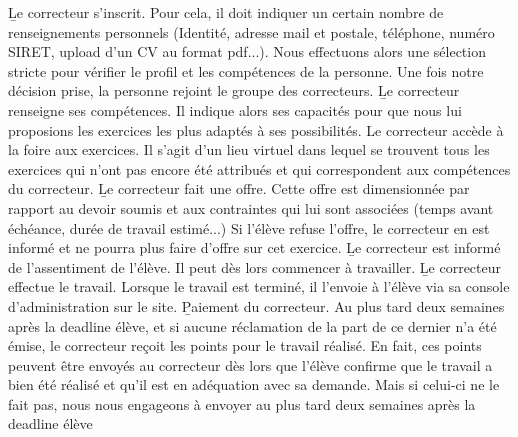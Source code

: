 ﻿\begin{enumerate}
	\li \b{Le correcteur s’inscrit.} Pour cela, il doit indiquer un certain nombre de renseignements personnels  (Identité, adresse mail et postale, téléphone, numéro SIRET, upload d’un CV au format pdf...). Nous effectuons alors une sélection stricte pour vérifier le profil et les compétences de la personne. Une fois notre décision prise, la personne rejoint le groupe des correcteurs.
	\li\b{Le correcteur renseigne ses compétences.} Il indique alors ses capacités pour que nous lui proposions les exercices les plus adaptés à ses possibilités.
	\li \b{ Le correcteur accède à la foire aux exercices.} Il s’agit d’un lieu virtuel dans lequel se trouvent tous les exercices qui n’ont pas encore été attribués et qui correspondent aux compétences du correcteur.
	\li \b{Le correcteur fait une offre.}  Cette offre est dimensionnée par rapport au devoir soumis et aux contraintes qui lui sont associées (temps avant échéance, durée de travail estimé...) Si l’élève refuse l’offre, le correcteur en est informé et ne pourra plus faire d’offre sur cet exercice.
	\li \b{Le correcteur est informé de l’assentiment de l’élève.} Il peut dès lors commencer à travailler.
	\li \b{Le correcteur effectue le travail.} Lorsque le travail est terminé, il l’envoie à l’élève via sa console d’administration sur le site.
	\li \b{Paiement du correcteur.} Au plus tard deux semaines après la deadline élève, et si aucune réclamation de la part de ce dernier n’a été émise, le correcteur reçoit les points pour le travail réalisé. En fait, ces points peuvent être envoyés au correcteur dès lors que l’élève confirme que le travail a bien été réalisé et qu’il est en adéquation avec sa demande. Mais si celui-ci ne le fait pas, nous nous engageons à envoyer au plus tard deux semaines après la deadline élève
\end{enumerate}